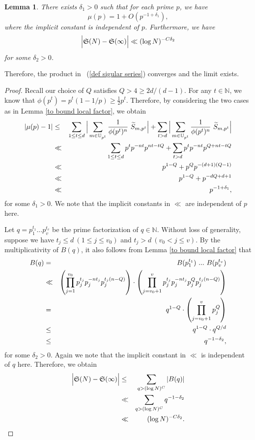 \documentclass[12pt]{amsart}
\newtheorem{lem}[thm]{Lemma}
\theoremstyle{definition}
\theoremstyle{remark}
\numberwithin{equation}{section}
\begin{document}
\begin{lem}
\label{singular series lemma}
There exists $\delta_1 > 0$ such that for each prime $p$, we have
$$
\mu(p) = 1 + O(p^{-1 + \delta_1}),
$$
where the implicit constant is independent of $p$.
Furthermore, we have
$$
\Big{|} \mathfrak{S}(N) -  \mathfrak{S}(\infty) \Big{|} \ll (\log N)^{-C \delta_2 }
$$
for some $\delta_2 > 0$.
\end{lem}
Therefore, the product in ~(\ref{def sigular series}) converges and the limit exists.
\begin{proof}
Recall our choice of $Q$ satisfies $Q > 4 \geq 2d/(d-1)$.
For any $t \in \mathbb{N}$, we know that $\phi(p^t) = p^t(1 - 1/p) \geq \frac12 p^t$.
Therefore, by considering the two cases as in Lemma \ref{to bound local factor}, we obtain
\begin{eqnarray}
| \mu(p) - 1 |
&\leq&
\sum_{1 \leq t \leq d} \Big{|} \sum_{{m} \in \mathbb{U}_{p^t}} \frac{1}{\phi(p^t)^n} \ \widetilde{S}_{ {m}, p^t }  \Big{|}
+
\sum_{ t > d} \Big{|} \sum_{{m} \in \mathbb{U}_{p^t}} \frac{1}{\phi(p^t)^n} \ \widetilde{S}_{ {m}, p^t } \Big{|}
\notag
\\
&\ll&
\sum_{1 \leq t \leq d} p^{t} p^{-nt} p^{nt - t Q }
+
\sum_{ t > d} p^{t} p^{-nt} p^{Q + nt - t Q }
\notag
\\
&\ll&
p^{1 - Q }
+
p^Q p^{-(d+1)(Q-1)}
\notag
\\
&\ll&
p^{1 - Q }
+
p^{-dQ + d +1 }
\notag
\\
&\ll&
p^{-1 + \delta_1},
\notag
\end{eqnarray}
for some $\delta_1 > 0$. We note that the implicit constants in $\ll$ are independent of $p$ here.

Let $q = p_1^{t_1} ... p_{v}^{t_{v}}$ be the prime factorization of $q \in \mathbb{N}$.
Without loss of generality, suppose we have $t_j \leq d \ (1 \leq j \leq v_0)$ and
$t_j > d \ (v_0 < j \leq v)$.
By the multiplicativity of $B(q)$, it also follows from Lemma \ref{to bound local factor} that
\begin{eqnarray}
B(q)
&=&
B(p_1^{t_1}) \ ... \  B(p_{v}^{t_{v}})
\notag
\\
&\ll&
\left( \prod_{j=1}^{v_0} p_j^{t_j} p_j^{-n t_j}  p_j^{t_j (n - Q)} \right) \cdot \left(  \prod_{j=v_0 + 1}^{v}  p_j^{t_j} p_j^{-n t_j} p_j^{Q} p_j^{t_j (n - Q)} \right)
\notag
\\
&=&
q^{1 - Q} \cdot  \left(  \prod_{j=v_0 + 1}^{v}  p_j^{ Q } \right)
\notag
\\
&\leq&
q^{1 - Q} \cdot  q^{Q/d}
\notag
\\
&\leq&
q^{- 1 - \delta_2},
\notag
\end{eqnarray}
for some $\delta_2 > 0$. Again we note that the implicit constant in $\ll$ is independent of $q$ here.
Therefore, we obtain
\begin{eqnarray}
\Big{|} \mathfrak{S}(N) -  \mathfrak{S}(\infty) \Big{|}
&\leq&
 \sum_{q > (\log N)^C } |  B(q) |
\notag
\\
&\ll&
\sum_{q > (\log N)^C } q^{- 1 - \delta_2}
\notag
\\
&\ll&
(\log N)^{- C \delta_2 }.
\notag
\end{eqnarray}
\end{proof}
\end{document}
